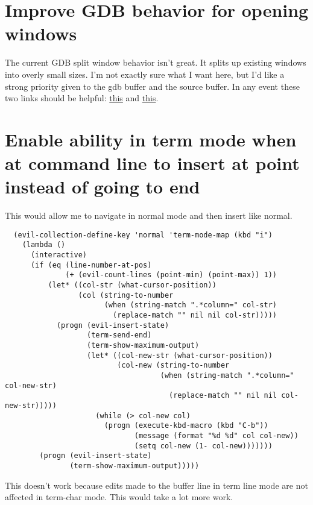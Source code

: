 \documentclass{default}
\begin{document}
\section{Improve GDB behavior for opening windows}

The current GDB split window behavior isn't great. It splits up existing windows into overly small
sizes. I'm not exactly sure what I want here, but I'd like a strong priority given to the gdb buffer
and the source buffer. In any event these two links should be helpful:
\href{https://emacs.stackexchange.com/questions/38945/m-x-gdb-dont-create-new-frames}{this} and
\href{https://www.gnu.org/software/emacs/manual/html_node/elisp/Display-Action-Functions.html}{this}.

\section{Enable ability in term mode when at command line to insert at point instead of going to
  end}

This would allow me to navigate in normal mode and then insert like normal.

\begin{verbatim}
  (evil-collection-define-key 'normal 'term-mode-map (kbd "i")
    (lambda ()
      (interactive)
      (if (eq (line-number-at-pos)
              (+ (evil-count-lines (point-min) (point-max)) 1))
          (let* ((col-str (what-cursor-position))
                 (col (string-to-number
                       (when (string-match ".*column=" col-str)
                         (replace-match "" nil nil col-str)))))
            (progn (evil-insert-state)
                   (term-send-end)
                   (term-show-maximum-output)
                   (let* ((col-new-str (what-cursor-position))
                          (col-new (string-to-number
                                    (when (string-match ".*column=" col-new-str)
                                      (replace-match "" nil nil col-new-str)))))
                     (while (> col-new col)
                       (progn (execute-kbd-macro (kbd "C-b"))
                              (message (format "%d %d" col col-new))
                              (setq col-new (1- col-new)))))))
        (progn (evil-insert-state)
               (term-show-maximum-output)))))
\end{verbatim}

This doesn't work because edits made to the buffer line in term line mode are not affected in
term-char mode. This would take a lot more work.
\end{document}
